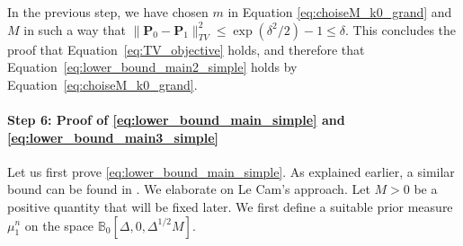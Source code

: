 \documentclass[twoside,11pt]{article}
\def\bbB{\mathbb{B}}
\newcommand{\<}{\langle}
\renewcommand{\>}{\rangle}
\begin{document}
 
 In the previous step, we have chosen $m$ in Equation \eqref{eq:choiseM_k0_grand} and $M$ in such a way that $\|{\mathbf P}_0 - {\mathbf P}_1\|^2_{TV}\leq \exp(\delta^2/2) -1\leq \delta$. This concludes the proof that Equation~\eqref{eq:TV_objective} holds, and therefore that Equation~\eqref{eq:lower_bound_main2_simple} holds by Equation~\eqref{eq:choiseM_k0_grand}.




 \paragraph{Step 6: Proof of \eqref{eq:lower_bound_main_simple} and \eqref{eq:lower_bound_main3_simple}}


Let us first prove \eqref{eq:lower_bound_main_simple}. As explained earlier, a similar bound can be found in \cite{baraud02}. We elaborate on Le Cam's approach. Let $M>0$ be a positive quantity that will be fixed later. We first define a suitable prior measure $\mu_1^n$ on the space $\bbB_0[\Delta,0,\Delta^{1/2}M]$. 
 
\end{document}
